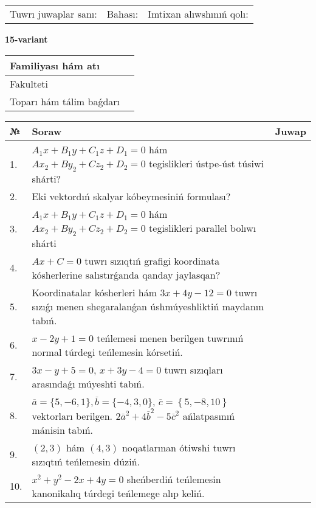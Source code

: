 \documentclass{article}
\begin{document}
\vspace{1cm}

\begin{tabular}{lll}
Tuwrı juwaplar sanı: \underline{\hspace{1.5cm}} & 
Bahası: \underline{\hspace{1.5cm}} & 
Imtixan alıwshınıń qolı: \underline{\hspace{2cm}} \\
\end{tabular}

\egroup

\newpage


\textbf{15-variant}\\

\bgroup
\def\arraystretch{1.6} %

\begin{tabular}{|m{5.7cm}|m{9.5cm}|}
\hline
Familiyası hám atı & \\
\hline
Fakulteti  & \\
\hline
Toparı hám tálim baǵdarı  & \\
\hline
\end{tabular}

\vspace{1cm}

\begin{tabular}{|m{0.7cm}|m{10cm}|m{4cm}|}
\hline
№ & Soraw & Juwap \\
\hline
1. & $A_1x+B_1y+C_1z+D_1=0$ hám $Ax_2+By_2+Cz_2+D_2=0$ tegislikleri ústpe-úst túsiwi shárti? &  \\
\hline
2. & Eki vektordıń skalyar kóbeymesiniń formulası? &  \\
\hline
3. & $A_1x+B_1y+C_1z+D_1=0$ hám $Ax_2+By_2+Cz_2+D_2=0$ tegislikleri parallel bolıwı shárti &  \\
\hline
4. & $Ax+C=0$ tuwrı sızıqtıń grafigi koordinata kósherlerine salıstırǵanda qanday jaylasqan? &  \\
\hline
5. & Koordinatalar kósherleri hám $ 3x+4y-12=0 $ tuwrı sızıǵı menen shegaralanǵan úshmúyeshliktiń maydanın tabıń. &  \\
\hline
6. & $x-2y+1=0$ teńlemesi menen berilgen tuwrınıń normal túrdegi teńlemesin kórsetiń. &  \\
\hline
7. & $3x-y+5=0$, $x+3y-4=0$ tuwrı sızıqları arasındaǵı múyeshti tabıń. &  \\
\hline
8. & $\overline{a}=\{5,-6, 1 \}, \overline{b}=\{-4, 3, 0 \} $, $\overline{c}=\left\{ 5,-8, 10 \right\}$ vektorları berilgen. $2{\overline{a}}^{2}+4{\overline{b}}^{2}-5{\overline{c}}^{2}$ ańlatpasınıń mánisin tabıń. &  \\
\hline
9. & $(2, 3)$ hám $(4, 3)$ noqatlarınan ótiwshi tuwrı sızıqtıń teńlemesin dúziń. &  \\
\hline
10. & $x^{2}+y^{2}-2x+4y=0$ sheńberdiń teńlemesin kanonikalıq túrdegi teńlemege alıp keliń. &  \\
\hline
\end{tabular}
\end{document}
